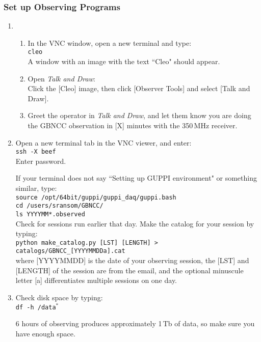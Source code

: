 \documentclass[11pt]{article}
\begin{document}
\subsubsection{Set up Observing Programs}\label{VNC:stuff} %
\begin{enumerate}
 \item \begin{enumerate}%
  \item In the VNC window, open a new terminal and type: \\ %
  \texttt{cleo} \\
  A window with an image with the text ``Cleo" should appear. 
  \item Open \textit{Talk and Draw}: \\
  Click the [Cleo] image, then click [Observer Tools] and select [Talk and Draw]. %
  \item Greet the operator in \textit{Talk and Draw}, and let them know you are doing the GBNCC observation in [X] minutes with the 350\,MHz receiver.  %
 \end{enumerate}

 \item Open a new terminal tab in the VNC viewer, and enter: \\ %
 \texttt{ssh -X beef} \\
 Enter password.  
 
 If your terminal does not say ``Setting up GUPPI environment" or something similar, type: \\
 {\tt source /opt/64bit/guppi/guppi\_daq/guppi.bash} \\
 \texttt{cd /users/sransom/GBNCC/ \\
 ls YYYYMM*.observed} \\
 Check for sessions run earlier that day. Make the catalog for your session by typing: \\
 \texttt{python make\_catalog.py [LST] [LENGTH] > catalogs/GBNCC\_[YYYYMMDDa].cat} \\
 where [YYYYMMDD] is the date of your observing session, the [LST] and [LENGTH] of the session are from the email, and the optional minuscule letter [a] differentiates multiple sessions on one day.  
 
 \item Check disk space by typing: \\ %
 \texttt{df -h /data$^*$}

 6 hours of observing produces approximately 1\,Tb of data, so make sure you have enough space. 
 

\end{enumerate}
\end{document}
